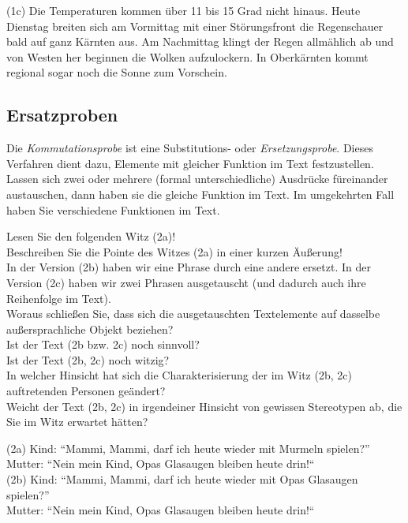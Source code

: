 \documentclass[
  letterpaper,
]{scrbook}
\begin{document}
(1c) Die Temperaturen kommen über 11 bis 15 Grad nicht hinaus. Heute
Dienstag breiten sich am Vormittag mit einer Störungsfront die
Regenschauer bald auf ganz Kärnten aus. Am Nachmittag klingt der Regen
allmählich ab und von Westen her beginnen die Wolken aufzulockern. In
Oberkärnten kommt regional sogar noch die Sonne zum Vorschein.

\hypertarget{ersatzproben}{%
\subsection{Ersatzproben}\label{ersatzproben}}

Die \emph{Kommutationsprobe} ist eine Substitutions- oder
\emph{Ersetzungsprobe}. Dieses Verfahren dient dazu, Elemente mit
gleicher Funktion im Text festzustellen. Lassen sich zwei oder mehrere
(formal unterschiedliche) Ausdrücke füreinander austauschen, dann haben
sie die gleiche Funktion im Text. Im umgekehrten Fall haben Sie
verschiedene Funktionen im Text.

Lesen Sie den folgenden Witz (2a)!\\
Beschreiben Sie die Pointe des Witzes (2a) in einer kurzen Äußerung!\\
In der Version (2b) haben wir eine Phrase durch eine andere ersetzt. In
der Version (2c) haben wir zwei Phrasen ausgetauscht (und dadurch auch
ihre Reihenfolge im Text).\\
Woraus schließen Sie, dass sich die ausgetauschten Textelemente auf
dasselbe außersprachliche Objekt beziehen?\\
Ist der Text (2b bzw. 2c) noch sinnvoll?\\
Ist der Text (2b, 2c) noch witzig?\\
In welcher Hinsicht hat sich die Charakterisierung der im Witz (2b, 2c)
auftretenden Personen geändert?\\
Weicht der Text (2b, 2c) in irgendeiner Hinsicht von gewissen
Stereotypen ab, die Sie im Witz erwartet hätten?

(2a) Kind: ``Mammi, Mammi, darf ich heute wieder mit Murmeln
spielen?''\\
Mutter: ``Nein mein Kind, Opas Glasaugen bleiben heute drin!{}``\\

(2b) Kind: ``Mammi, Mammi, darf ich heute wieder mit Opas Glasaugen
spielen?''\\
Mutter: ``Nein mein Kind, Opas Glasaugen bleiben heute drin!{}``\\
\end{document}

